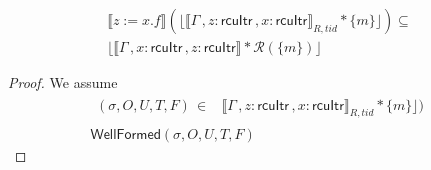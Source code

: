     \begin{lemma}
   \label{lemma:rreadheap}
\begin{align*}
  \llbracket z:=x.f \rrbracket (\lfloor \llbracket \Gamma\, , z:\textsf{rcuItr}\, ,  x:\textsf{rcuItr} \rrbracket_{R,tid} * \{m\}\rfloor)  \subseteq \\
                                                              \lfloor \llbracket \Gamma\,,  x:\textsf{rcuItr} \, ,z:\textsf{rcuItr}   \rrbracket  * \mathcal{R}(\{m\})\rfloor
\end{align*}
 \end{lemma}
    \begin{proof}
        We assume
\begin{gather}\label{ahu1hrr}
  \begin{aligned}
    (\sigma, O, U, T,F) \, \in &  \llbracket \Gamma\, , z:\textsf{rcuItr}\, ,  x:\textsf{rcuItr} \rrbracket_{R,tid} * \{m\}\rfloor)
    \end{aligned} \\
\textsf{WellFormed}(\sigma,O,U,T,F)
\label{ahu2hrr}
\end{gather}


\end{proof}
